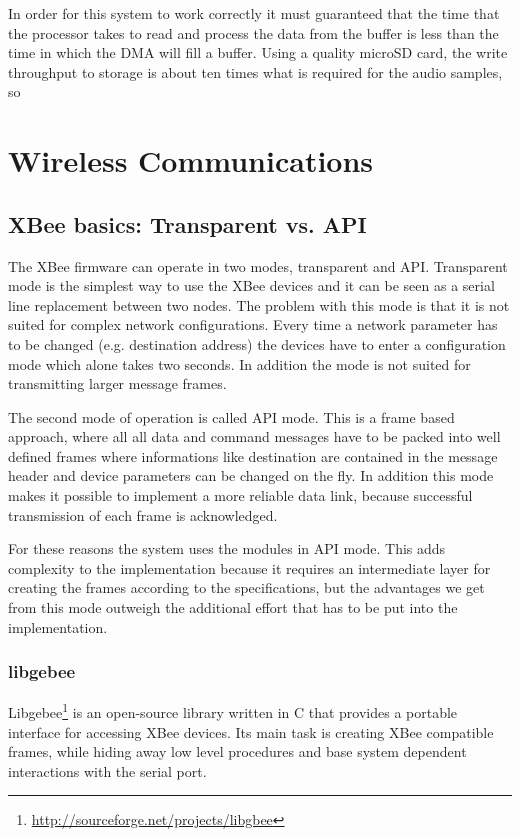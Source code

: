 In order for this system to work correctly it must guaranteed that the time that the processor takes to read and process the data from the buffer is less than the time in which the DMA will fill a buffer. Using a quality microSD card, the write throughput to storage is about ten times what is required for the audio samples, so 


\section{Wireless Communications}
\label{sec:wireless_communication_software}

\subsection{XBee basics: Transparent vs. API}
The XBee firmware can operate in two modes, transparent and API. Transparent mode is the simplest way to use the XBee devices and it can be seen as a serial line replacement between two nodes. The problem with this mode is that it is not suited for complex network configurations. Every time a network parameter has to be changed (e.g. destination address) the devices have to enter a configuration mode which alone takes two seconds. In addition the mode is not suited for transmitting larger message frames. 

The second mode of operation is called API mode. This is a frame based approach, where all all data and command messages have to be packed into well defined frames where informations like destination are contained in the message header and device parameters can be changed on the fly. In addition this mode makes it possible to implement a more reliable data link, because successful transmission of each frame is acknowledged.

For these reasons the system uses the modules in API mode. This adds complexity to the implementation because it requires an intermediate layer for creating the frames according to the specifications, but the advantages we get from this mode outweigh the additional effort that has to be put into the implementation. 


\subsubsection*{libgebee}
Libgebee\footnote{\url{http://sourceforge.net/projects/libgbee}} is an open-source library written in C that provides a portable interface for accessing XBee devices. Its main task is creating XBee compatible frames, while hiding away low level procedures and base system dependent interactions with the serial port.

